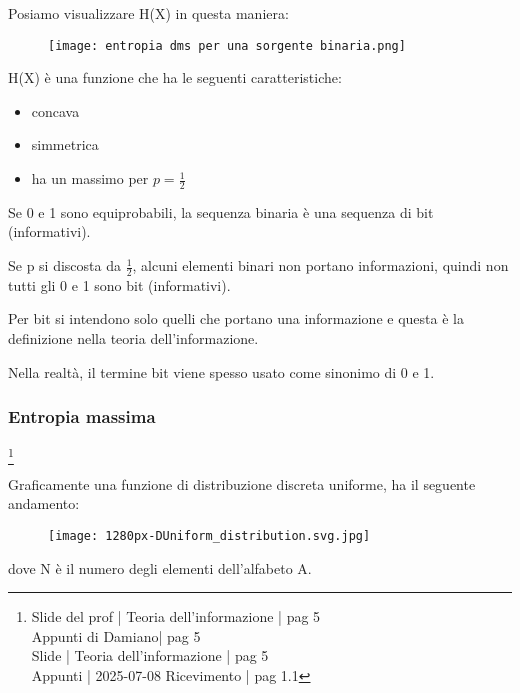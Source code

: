 Posiamo visualizzare H(X) in questa maniera: 

\begin{figure}[h]
    \centering
    \texttt{[image: entropia dms per una sorgente binaria.png]}
\end{figure}

H(X) è una funzione che ha le seguenti caratteristiche: 

\begin{itemize}
    \item concava 
    \item simmetrica 
    \item ha un massimo per $p = \frac{1}{2}$
\end{itemize}

Se 0 e 1 sono equiprobabili, la sequenza binaria è una sequenza di bit (informativi). \newline 

Se p si discosta da $\frac{1}{2}$, alcuni elementi binari non portano informazioni, quindi non tutti gli 0 e 1 sono bit (informativi). \newline 

\begin{tcolorbox}
Per bit si intendono solo quelli che portano una informazione e questa è la definizione nella teoria dell'informazione. \newline 

Nella realtà, il termine bit viene spesso usato come sinonimo di 0 e 1. 
\end{tcolorbox}

\newpage 

\subsubsection{Entropia massima}
\footnote{Slide del prof | Teoria dell'informazione | pag 5 \\  
Appunti di Damiano| pag 5 \\
Slide | Teoria dell'informazione | pag 5 \\
Appunti | 2025-07-08 Ricevimento | pag 1.1}

Graficamente una funzione di distribuzione discreta uniforme, ha il seguente andamento: 

\begin{figure}[h]
    \centering
    \texttt{[image: 1280px-DUniform\_distribution.svg.jpg]}
\end{figure} 

dove N è il numero degli elementi dell'alfabeto A. \newline 

